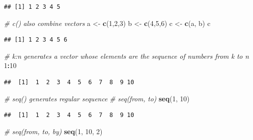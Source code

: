 \documentclass[]{book}
\newenvironment{Shaded}{\begin{snugshade}}{\end{snugshade}}
\newcommand{\CommentTok}[1]{\textcolor[rgb]{0.56,0.35,0.01}{\textit{#1}}}
\newcommand{\DecValTok}[1]{\textcolor[rgb]{0.00,0.00,0.81}{#1}}
\newcommand{\KeywordTok}[1]{\textcolor[rgb]{0.13,0.29,0.53}{\textbf{#1}}}
\newcommand{\NormalTok}[1]{#1}
\newcommand{\OperatorTok}[1]{\textcolor[rgb]{0.81,0.36,0.00}{\textbf{#1}}}
\newcommand{\StringTok}[1]{\textcolor[rgb]{0.31,0.60,0.02}{#1}}
\begin{document}
\begin{verbatim}
## [1] 1 2 3 4 5
\end{verbatim}

\begin{Shaded}
\begin{Highlighting}[]
\CommentTok{# c() also combine vectors}
\NormalTok{a <-}\StringTok{ }\KeywordTok{c}\NormalTok{(}\DecValTok{1}\NormalTok{,}\DecValTok{2}\NormalTok{,}\DecValTok{3}\NormalTok{)}
\NormalTok{b <-}\StringTok{ }\KeywordTok{c}\NormalTok{(}\DecValTok{4}\NormalTok{,}\DecValTok{5}\NormalTok{,}\DecValTok{6}\NormalTok{)}
\NormalTok{c <-}\StringTok{ }\KeywordTok{c}\NormalTok{(a, b)}
\NormalTok{c}
\end{Highlighting}
\end{Shaded}

\begin{verbatim}
## [1] 1 2 3 4 5 6
\end{verbatim}

\begin{Shaded}
\begin{Highlighting}[]
\CommentTok{# k:n generates a vector whose elements are the sequence of numbers from k to n}
\DecValTok{1}\OperatorTok{:}\DecValTok{10}
\end{Highlighting}
\end{Shaded}

\begin{verbatim}
##  [1]  1  2  3  4  5  6  7  8  9 10
\end{verbatim}

\begin{Shaded}
\begin{Highlighting}[]
\CommentTok{# seq() generates regular sequence}
\CommentTok{# seq(from, to)}
\KeywordTok{seq}\NormalTok{(}\DecValTok{1}\NormalTok{, }\DecValTok{10}\NormalTok{)}
\end{Highlighting}
\end{Shaded}

\begin{verbatim}
##  [1]  1  2  3  4  5  6  7  8  9 10
\end{verbatim}

\begin{Shaded}
\begin{Highlighting}[]
\CommentTok{# seq(from, to, by)}
\KeywordTok{seq}\NormalTok{(}\DecValTok{1}\NormalTok{, }\DecValTok{10}\NormalTok{, }\DecValTok{2}\NormalTok{)}
\end{Highlighting}
\end{Shaded}
\end{document}
